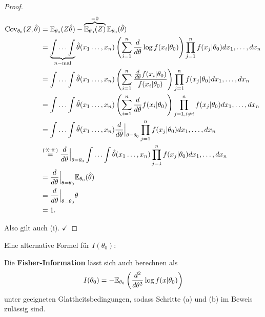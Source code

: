 \documentclass{tstextbook}
\begin{document}
\begin{proof}
	\[
	\begin{aligned}
		\Cov_{\theta_0}(Z,\hat{\theta}) & = \E_{\theta_0}(Z\hat{\theta})-\overbrace{\E_{\theta_0}(Z)}^{=0}\E_{\theta_0}(\hat{\theta}) \\
		& = \underbrace{\int\ldots\int}_{n-{\text{mal}}}\hat{\theta}(x_1\ldots,x_n)\left(\sum_{i=1}^{n}\frac{d}{d\theta}\log f(x_i|\theta_0)\right)\prod_{j=1}^{n} f(x_j|\theta_0) dx_1,\ldots,dx_n \\
		& = \int\ldots\int\hat{\theta}(x_1\ldots,x_n)\left(\sum_{i=1}^{n}\frac{\frac{d}{d\theta}f(x_i|\theta_0)}{f(x_i|\theta_0)}\right)\prod_{j=1}^{n} f(x_j|\theta_0) dx_1,\ldots,dx_n \\
		& = \int\ldots\int\hat{\theta}(x_1\ldots,x_n)\left(\sum_{i=1}^{n}\frac{d}{d\theta}f(x_i|\theta_0)\right)\prod_{j=1,i\ne i}^{n} f(x_j|\theta_0) dx_1,\ldots,dx_n \\
		& = \int\ldots\int\hat{\theta}(x_1\ldots,x_n)\frac{d}{d\theta}\Big|_{\theta=\theta_0}\prod_{j=1}^{n} f(x_j|\theta_0) dx_1,\ldots,dx_n \\
		& \overset{(\hexstar\hexstar)}{=} \frac{d}{d\theta}\Big|_{\theta=\theta_0} \int\ldots\int\hat{\theta}(x_1\ldots,x_n)\prod_{j=1}^{n} f(x_j|\theta_0) dx_1,\ldots,dx_n \\
		& = \frac{d}{d\theta}\Big|_{\theta=\theta_0} \E_{\theta_0}(\hat{\theta}) \\
		& = \frac{d}{d\theta}\Big|_{\theta=\theta_0} \theta \\
		& = 1.
	\end{aligned}
	\]
	
	Also gilt auch (i). $ \checkmark $
	
\end{proof}


Eine alternative Formel für $ I(\theta_0) $: 

\begin{lemma}
	Die \textbf{Fisher-Information}  lässt sich auch berechnen als 
	\[I(\theta_0)=-\mathbb E_{\theta_0}\left(\frac{d^2}{d\theta^2}\log f(x|\theta_0)\right)\] 
	unter geeigneten Glattheitsbedingungen, sodass Schritte (a) und (b) im Beweis zulässig sind.
\end{lemma}
\end{document}
